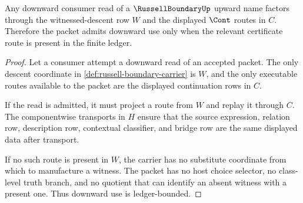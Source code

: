 \begin{theorem}
\label{thm:russell-boundary-witnessed-descent-ledger}
Any downward consumer read of a $\RussellBoundaryUp$ upward name factors through the witnessed-descent row $W$ and the displayed $\Cont$ routes in $C$. Therefore the packet admits downward use only when the relevant certificate route is present in the finite ledger.
\end{theorem}
\begin{proof}
Let a consumer attempt a downward read of an accepted packet. The only descent coordinate in \autoref{def:russell-boundary-carrier} is $W$, and the only executable routes available to the packet are the displayed continuation rows in $C$.

If the read is admitted, it must project a route from $W$ and replay it through $C$. The componentwise transports in $H$ ensure that the source expression, relation row, description row, contextual classifier, and bridge row are the same displayed data after transport.

If no such route is present in $W$, the carrier has no substitute coordinate from which to manufacture a witness. The packet has no host choice selector, no class-level truth branch, and no quotient that can identify an absent witness with a present one. Thus downward use is ledger-bounded.
\end{proof}

